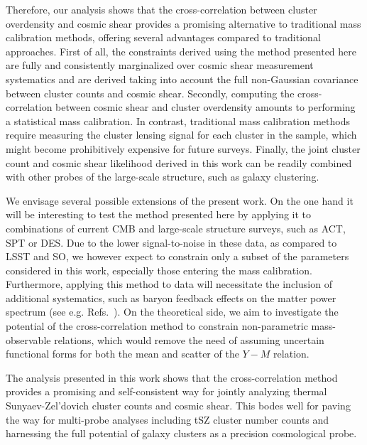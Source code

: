 \documentclass[%
 reprint,
nofootinbib,
 amsmath,amssymb,
 aps,
]{revtex4-1}
\begin{document}
Therefore, our analysis shows that the cross-correlation between cluster overdensity and cosmic shear provides a promising alternative to traditional mass calibration methods, offering several advantages compared to traditional approaches. First of all, the constraints derived using the method presented here are fully and consistently marginalized over cosmic shear measurement systematics and are derived taking into account the full non-Gaussian covariance between cluster counts and cosmic shear. Secondly, computing the cross-correlation between cosmic shear and cluster overdensity amounts to performing a statistical mass calibration. In contrast, traditional mass calibration methods require measuring the cluster lensing signal for each cluster in the sample, which might become prohibitively expensive for future surveys. Finally, the joint cluster count and cosmic shear likelihood derived in this work can be readily combined with other probes of the large-scale structure, such as galaxy clustering.

We envisage several possible extensions of the present work. On the one hand it will be interesting to test the method presented here by applying it to combinations of current CMB and large-scale structure surveys, such as ACT, SPT or DES. Due to the lower signal-to-noise in these data, as compared to LSST and SO, we however expect to constrain only a subset of the parameters considered in this work, especially those entering the mass calibration. Furthermore, applying this method to data will necessitate the inclusion of additional systematics, such as baryon feedback effects on the matter power spectrum (see e.g. Refs.~\cite{Rudd:2008, vanDaalen:2011}). On the theoretical side, we aim to investigate the potential of the cross-correlation method to constrain non-parametric mass-observable relations, which would remove the need of assuming uncertain functional forms for both the mean and scatter of the $Y-M$ relation. 

The analysis presented in this work shows that the cross-correlation method provides a promising and self-consistent way for jointly analyzing thermal Sunyaev-Zel'dovich cluster counts and cosmic shear. This bodes well for paving the way for multi-probe analyses including tSZ cluster number counts and harnessing the full potential of galaxy clusters as a precision cosmological probe.
\end{document}
